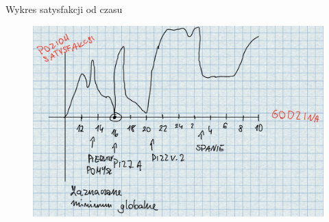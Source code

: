 \documentclass{beamer}
\begin{document}
\begin{frame}{Wykres satysfakcji od czasu}
\begin{figure}
    \centering
    \includegraphics[width=0.7\linewidth]{satisfaction.jpeg}
\end{figure}
\end{frame}
\end{document}
